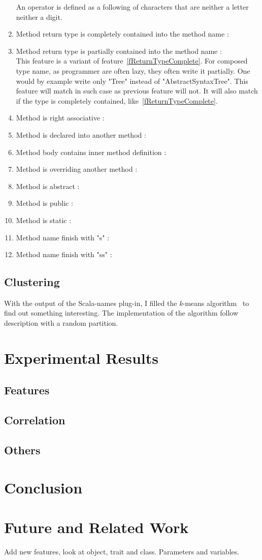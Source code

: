 \documentclass[12pt]{article}
\begin{document}
\begin{enumerate}
	An operator is defined as a following of characters that are neither a letter neither a digit.
\item Method return type is completely contained into the method name :
\item Method return type is partially contained into the method name :\label{fReturnTypeComplete}\\
	This feature is a variant of feature~\ref{fReturnTypeComplete}. For composed type name, as programmer are often lazy, they often write it partially. One would by example write only "Tree" instead of "AbstractSyntaxTree". This feature will match in such case as previous feature will not. It will also match if the type is completely contained, like~\ref{fReturnTypeComplete}.
\item Method is right associative :
\item Method is declared into another method :
\item Method body contains inner method definition :
\item Method is overriding another method :
\item Method is abstract :
\item Method is public :
\item Method is static :
\item Method name finish with "s" :
\item Method name finish with "ss" : 

\end{enumerate}

\subsection{Clustering}
With the output of the Scala-names plug-in, I filled the \textit{k}-means algorithm~\cite{kMeans} to find out something interesting. The implementation of the algorithm follow~\cite{kMeans} description with a random partition.

\section {Experimental Results}

\subsection {Features}

\subsection {Correlation}

\subsection {Others} 

\section {Conclusion} 

\section {Future and Related Work}
Add new features, look at object, trait and class. Parameters and variables. 

\newpage



\end{document}
